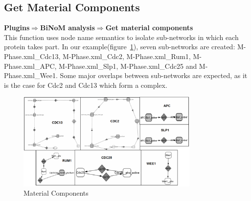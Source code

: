 \subsection{Get Material Components}
\textbf{Plugins$\Rightarrow$BiNoM analysis$\Rightarrow$Get material components}\\
This function uses node name semantics to isolate sub-networks in which each protein takes part. In our example(figure~\ref{Material_Components}), seven sub-networks are created: M-Phase.xml\_Cdc13, M-Phase.xml\_Cdc2, M-Phase.xml\_Rum1, M-Phase.xml\_APC, M-Phase.xml\_Slp1, M-Phase.xml\_Cdc25 and M-Phase.xml\_Wee1. Some major overlaps between sub-networks are expected, as it is the case for Cdc2 and Cdc13 which form a complex.\\
\begin{figure}
\centering
\includegraphics[width=0.8\textwidth]{graphics/Material_Components}
\caption{Material Components}
\label{Material_Components}
\end{figure}

